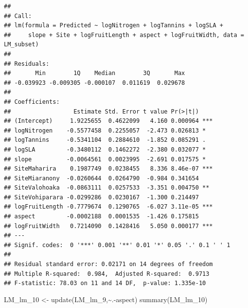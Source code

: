\documentclass[
  12pt,
]{article}
\newenvironment{Shaded}{\begin{snugshade}}{\end{snugshade}}
\newcommand{\FunctionTok}[1]{\textcolor[rgb]{0.00,0.00,0.00}{#1}}
\newcommand{\NormalTok}[1]{#1}
\newcommand{\OtherTok}[1]{\textcolor[rgb]{0.56,0.35,0.01}{#1}}
\newcommand{\SpecialCharTok}[1]{\textcolor[rgb]{0.00,0.00,0.00}{#1}}
\begin{document}
\begin{verbatim}
## 
## Call:
## lm(formula = Predicted ~ logNitrogen + logTannins + logSLA + 
##     slope + Site + logFruitLength + aspect + logFruitWidth, data = LM_subset)
## 
## Residuals:
##       Min        1Q    Median        3Q       Max 
## -0.039923 -0.009305 -0.000107  0.011619  0.029678 
## 
## Coefficients:
##                  Estimate Std. Error t value Pr(>|t|)    
## (Intercept)     1.9225655  0.4622099   4.160 0.000964 ***
## logNitrogen    -0.5577458  0.2255057  -2.473 0.026813 *  
## logTannins     -0.5341104  0.2884610  -1.852 0.085291 .  
## logSLA         -0.3480112  0.1462272  -2.380 0.032077 *  
## slope          -0.0064561  0.0023995  -2.691 0.017575 *  
## SiteMaharira    0.1987749  0.0238455   8.336 8.46e-07 ***
## SiteMiaranony  -0.0260644  0.0264790  -0.984 0.341654    
## SiteValohoaka  -0.0863111  0.0257533  -3.351 0.004750 ** 
## SiteVohiparara -0.0299286  0.0230167  -1.300 0.214497    
## logFruitLength -0.7779674  0.1290765  -6.027 3.11e-05 ***
## aspect         -0.0002188  0.0001535  -1.426 0.175815    
## logFruitWidth   0.7214090  0.1428416   5.050 0.000177 ***
## ---
## Signif. codes:  0 '***' 0.001 '**' 0.01 '*' 0.05 '.' 0.1 ' ' 1
## 
## Residual standard error: 0.02171 on 14 degrees of freedom
## Multiple R-squared:  0.984,  Adjusted R-squared:  0.9713 
## F-statistic: 78.03 on 11 and 14 DF,  p-value: 1.335e-10
\end{verbatim}

\begin{Shaded}
\begin{Highlighting}[]
\NormalTok{LM\_lm\_10 }\OtherTok{\textless{}{-}} \FunctionTok{update}\NormalTok{(LM\_lm\_9,}\SpecialCharTok{\textasciitilde{}}\NormalTok{.}\SpecialCharTok{{-}}\NormalTok{aspect)}
\FunctionTok{summary}\NormalTok{(LM\_lm\_10)}
\end{Highlighting}
\end{Shaded}
\end{document}
